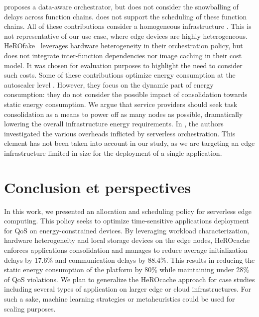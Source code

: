 \cite{smithFaDOFaaSFunctions2022} proposes a data-aware orchestrator, but does not consider the snowballing of delays across function chains. \cite{zhangFIRSTExploitingMultiDimensional2023} does not support the scheduling of these function chains.
All of these contributions consider a homogeneous infrastructure \cite{bhasiCypressInputSizesensitive2022, zijunFassflowEfficient2022, smithFaDOFaaSFunctions2022, zhangFIRSTExploitingMultiDimensional2023, abdiPaletteLoadBalancing2023}. This is not representative of our use case, where edge devices are highly heterogeneous. HeROfake~\cite{herofake} %
leverages hardware heterogeneity in their orchestration policy, but does not integrate inter-function dependencies nor image caching in their cost model. It was chosen for evaluation purposes to highlight the need to consider such costs. %
Some of these contributions optimize energy consumption at the autoscaler level \cite{bhasiCypressInputSizesensitive2022, zhangFIRSTExploitingMultiDimensional2023}. However, they focus on the dynamic part of energy consumption: they do not consider the possible impact of consolidation towards static energy consumption. We argue that service providers should seek task consolidation as a means to power off as many nodes as possible, dramatically lowering the overall infrastructure energy requirements.
In \cite{fuerstIluvatarFastControl2023}, the authors investigated the various overheads inflicted by serverless orchestration. This element has not been taken into account in our study, as we are targeting an edge infrastructure limited in size for the deployment of a single application.

\section{Conclusion et perspectives}
\label{section:herocache-conclusion}

In this work, we presented an allocation and scheduling policy for serverless edge computing. This policy seeks to optimize time-sensitive applications deployment for QoS on energy-constrained devices. By leveraging workload characterization, hardware heterogeneity and local storage devices on the edge nodes, HeROcache enforces applications consolidation and manages to reduce average initialization delays by 17.6\% and communication delays by 88.4\%. This results in reducing the static energy consumption of the platform by 80\% while maintaining under 28\% of QoS violations. We plan to generalize the HeROcache approach for case studies including several types of application on larger edge or cloud infrastructures. For such a sake, machine learning strategies or metaheuristics could be used for scaling purposes.
